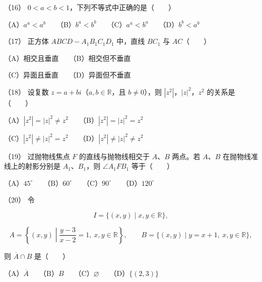 \begin{question}
（16） $0<a<b<1$，下列不等式中正确的是\mbox{（　　）}

（A）$a^a<a^b$　　（B）$b^a<b^b$　　（C）$a^a<b^a$　　（D）$b^b<a^b$

（17） 正方体 $ABCD-A_1B_1C_1D_1$ 中，直线 $BC_1$ 与 $AC$\mbox{（　　）}

（A）相交且垂直　　（B）相交但不垂直

（C）异面且垂直　　（D）异面但不垂直

（18） 设复数 $z=a+bi$（$a,b\in\mathbb R$，且 $b\ne0$），则 $|z^2|$，$|z|^2$，$z^2$ 的关系是\mbox{（　　）}

（A）$|z^2|=|z|^2\ne z^2$　　（B）$|z^2|=|z|^2=z^2$

（C）$|z^2|\ne|z|^2=z^2$　　（D）$|z^2|\ne|z|^2\ne z^2$

（19） 过抛物线焦点 $F$ 的直线与抛物线相交于 $A\text{、}B$ 两点。若 $A\text{、}B$ 在抛物线准线上的射影分别是 $A_1\text{、}B_1$，则 $\angle A_1FB_1$ 等于\mbox{（　　）}

（A）$45^\circ$　　（B）$60^\circ$　　（C）$90^\circ$　　（D）$120^\circ$

（20） 令

\nopagebreak[4]
\[
I=\{(x,y)\mid x,y\in\mathbb R\},
\]

\nopagebreak[4]
\[
A=\left\{(x,y)\middle|\frac{y-3}{x-2}=1,\ x,y\in\mathbb R\right\},
\qquad
B=\{(x,y)\mid y=x+1,\ x,y\in\mathbb R\},
\]

则 $\overline A\cap B$ 是\mbox{（　　）}

（A）$\overline A$　　（B）$B$　　（C）$\varnothing$　　（D）$\{(2,3)\}$

\end{question}
